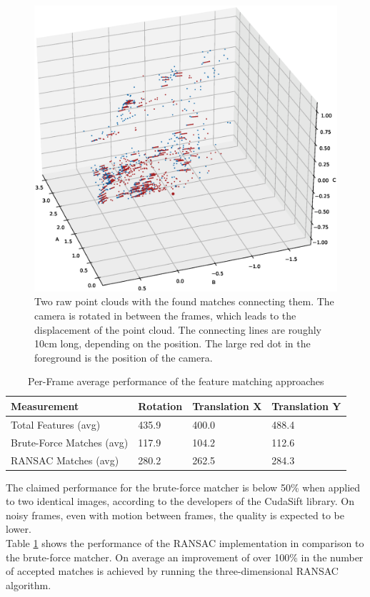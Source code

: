 \begin{figure}[H]
  \centering
  \includegraphics[width=1.0\textwidth,trim={7cm 7cm 8cm 5cm},clip]{images/3d_features_rotation.eps}
  \caption{Two raw point clouds with the found matches connecting them. The camera is rotated in between the frames, which leads to the displacement of the point cloud. The connecting lines are roughly 10cm long, depending on the position. The large red dot in the foreground is the position of the camera.}
  \label{im:3d_features_rotation}
\end{figure}
\begin{table}[ht] \centering
	\begin{tabular}{|p{5cm}|p{3cm}|p{3cm}|p{3cm}|} \hline
		\rowcolor{gray} Measurement & Rotation & Translation X & Translation Y \\
		\hline
		Total Features (avg) & 435.9 & 400.0 & 488.4\\
		\hline
		Brute-Force Matches (avg) & 117.9 & 104.2 & 112.6  \\
		\hline
		RANSAC Matches (avg) & 280.2 & 262.5 & 284.3  \\
		\hline
	\end{tabular}
	\caption{Per-Frame average performance of the feature matching approaches}
	\label{tab:ransac_performance}
 \end{table}
 The claimed performance for the brute-force matcher is below 50\% when applied to two identical images, according to the developers of the CudaSift library.\cite{cudaSiftRepo} On noisy frames, even with motion between frames, the quality is expected to be lower.\\
 Table \ref{tab:ransac_performance} shows the performance of the RANSAC implementation in comparison to the brute-force matcher. On average an improvement of over 100\% in the number of accepted matches is achieved by running the three-dimensional RANSAC algorithm.


